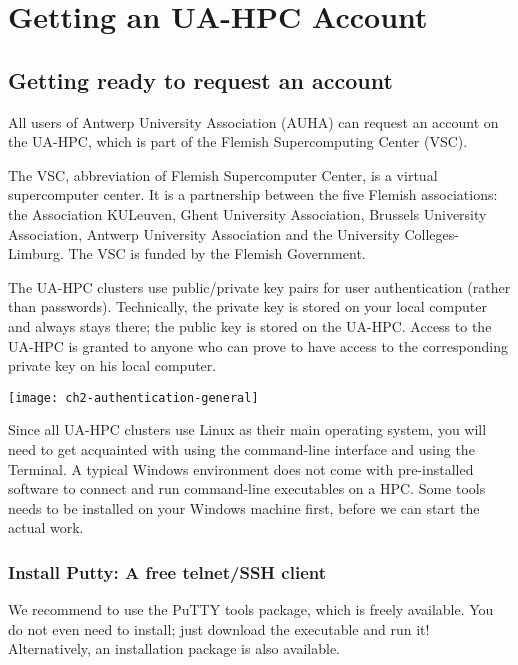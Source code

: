 \chapter{Getting an UA-HPC Account}
\label{ch:getting-a-hpc-account}

\section{Getting ready to request an account}
\label{sec:getting-ready-to-request-an-account}

All users of Antwerp University Association (AUHA) can request an account on
the UA-HPC, which is part of the Flemish Supercomputing Center (VSC).

The VSC, abbreviation of Flemish Supercomputer Center, is a virtual
supercomputer center. It is a partnership between the five Flemish
associations: the Association KULeuven,  Ghent University Association, Brussels
University Association, Antwerp University Association and the University
Colleges-Limburg. The VSC is funded by the Flemish Government.

The UA-HPC clusters use public/private key pairs for user authentication
(rather than passwords). Technically, the private key is stored on your local
computer and always stays there; the public key is stored on the UA-HPC.
Access to the UA-HPC is granted to anyone who can prove to have access to the
corresponding private key on his local computer.

\texttt{[image: ch2-authentication-general]}


  Since all UA-HPC clusters use Linux as their main operating system, you will
  need to get acquainted with using the command-line interface and using the
  Terminal. A typical Windows environment does not come with pre-installed
  software to connect and run command-line executables on a HPC. Some tools
  needs to be installed on your Windows machine first, before we can start the
  actual work.

  \subsection{Install Putty: A free telnet/SSH client}
  \label{subsec:install-putty}

  We recommend to use the PuTTY tools package, which is freely available. You
  do not even need to install; just download the executable and run it!
  Alternatively, an installation package is also available.

